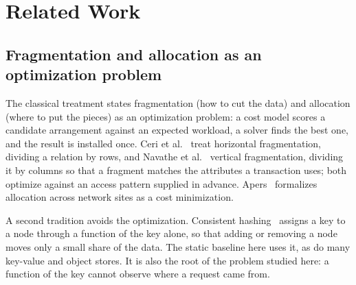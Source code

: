 %
%

\section{Related Work}

\subsection{Fragmentation and allocation as an optimization problem}

The classical treatment states fragmentation (how to cut the data) and
allocation (where to put the pieces) as an optimization problem: a cost model
scores a candidate arrangement against an expected workload, a solver finds the
best one, and the result is installed once. Ceri et al.~\cite{ceri1982horizontal}
treat horizontal fragmentation, dividing a relation by rows, and Navathe et
al.~\cite{navathe1984vertical} vertical fragmentation, dividing it by
columns so that a fragment matches the attributes a transaction uses; both
optimize against an access pattern supplied in advance.
Apers~\cite{apers1988allocation} formalizes allocation across network sites as
a cost minimization.

A second tradition avoids the optimization. Consistent
hashing~\cite{karger1997consistent} assigns a key to a node through a function
of the key alone, so that adding or removing a node moves only a small share of
the data. The static baseline here uses it, as do many
key-value and object stores. It is also the root of the problem studied here: a
function of the key cannot observe where a request came from.


